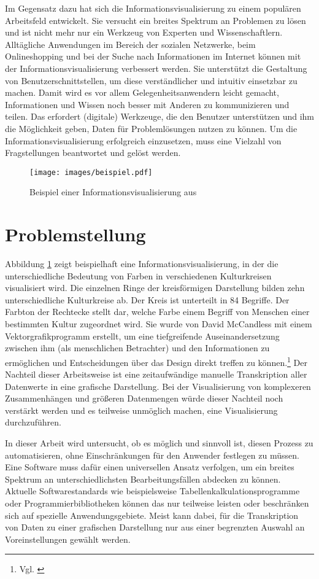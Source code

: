 \documentclass[a4paper, 
               12pt,
               DIV=calc,
               version=first,
               pdftex,
               headsepline,
               footsepline,
               bibtotocnumbered,
               liststotocnumbered]{scrreprt}
\begin{document}
Im Gegensatz dazu hat sich die Informationsvisualisierung zu einem populären Arbeitsfeld entwickelt. Sie versucht ein breites
Spektrum an Problemen zu lösen und ist nicht mehr nur ein Werkzeug von Experten und Wissenschaftlern.
Alltägliche Anwendungen
im Bereich der sozialen Netzwerke, beim Onlineshopping und bei der Suche nach Informationen
im Internet können mit der Informationsvisualisierung verbessert
werden. Sie unterstützt die Gestaltung von Benutzerschnittstellen, um diese verständlicher und intuitiv einsetzbar zu machen.
Damit wird es vor allem Gelegenheitsanwendern leicht gemacht, Informationen und
Wissen noch besser mit Anderen zu kommunizieren und teilen. Das erfordert (digitale) Werkzeuge,
die den Benutzer unterstützen und ihm die Möglichkeit geben, Daten für Problemlösungen nutzen zu können.
Um die Informationsvisualisierung erfolgreich einzusetzen, muss eine Vielzahl von Fragstellungen
beantwortet und gelöst werden.
\begin{figure}
\centering
\texttt{[image: images/beispiel.pdf]}
\caption{Beispiel einer Informationsvisualisierung aus \citep[S.\,76]{McCandless}}
\label{fig:beispiel}
\end{figure}
\section{Problemstellung}
Abbildung \ref{fig:beispiel} zeigt beispielhaft eine Informationsvisualisierung, in der die
unterschiedliche Bedeutung von Farben in verschiedenen
Kulturkreisen visualisiert wird. Die einzelnen Ringe der kreisförmigen Darstellung bilden zehn
unterschiedliche Kulturkreise ab. Der Kreis ist unterteilt in 84 Begriffe.
Der Farbton der Rechtecke stellt dar, welche Farbe einem Begriff von Menschen einer bestimmten Kultur zugeordnet wird.
Sie wurde von David McCandless mit einem Vektorgrafikprogramm erstellt, um
eine tiefgreifende Auseinandersetzung zwischen ihm (als menschlichen Betrachter) und den Informationen
zu ermöglichen und Entscheidungen über das Design direkt treffen zu können.\footnote{Vgl. \citep{infoblog}} Der Nachteil dieser
Arbeitsweise ist eine zeitaufwändige manuelle Transkription aller Datenwerte in eine grafische
Darstellung. Bei der Visualisierung von komplexeren Zusammenhängen und größeren Datenmengen würde dieser 
Nachteil noch verstärkt werden und es teilweise unmöglich machen, eine Visualisierung durchzuführen.

In dieser Arbeit wird untersucht, ob es möglich und sinnvoll ist, diesen Prozess  zu automatisieren,
ohne Einschränkungen für den Anwender festlegen zu müssen.
Eine Software muss dafür einen universellen Ansatz verfolgen, um ein breites Spektrum an
unterschiedlichsten Bearbeitungsfällen abdecken zu können. 
Aktuelle Softwarestandards wie beispielsweise Tabellenkalkulationsprogramme oder Programmierbibliotheken
können das nur teilweise leisten oder beschränken sich auf spezielle Anwendungsgebiete.
Meist kann dabei, für die Transkription von Daten zu einer grafischen Darstellung nur
aus einer begrenzten Auswahl an Voreinstellungen gewählt werden.
\end{document}

